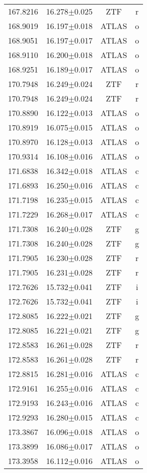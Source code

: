 \begin{table}
\begin{tabular}{cccc}
167.8216 & 16.278$\pm$0.025 & ZTF & r \\
168.9019 & 16.197$\pm$0.018 & ATLAS & o \\
168.9051 & 16.197$\pm$0.017 & ATLAS & o \\
168.9110 & 16.200$\pm$0.018 & ATLAS & o \\
168.9251 & 16.189$\pm$0.017 & ATLAS & o \\
170.7948 & 16.249$\pm$0.024 & ZTF & r \\
170.7948 & 16.249$\pm$0.024 & ZTF & r \\
170.8890 & 16.122$\pm$0.013 & ATLAS & o \\
170.8919 & 16.075$\pm$0.015 & ATLAS & o \\
170.8970 & 16.128$\pm$0.013 & ATLAS & o \\
170.9314 & 16.108$\pm$0.016 & ATLAS & o \\
171.6838 & 16.342$\pm$0.018 & ATLAS & c \\
171.6893 & 16.250$\pm$0.016 & ATLAS & c \\
171.7198 & 16.235$\pm$0.015 & ATLAS & c \\
171.7229 & 16.268$\pm$0.017 & ATLAS & c \\
171.7308 & 16.240$\pm$0.028 & ZTF & g \\
171.7308 & 16.240$\pm$0.028 & ZTF & g \\
171.7905 & 16.230$\pm$0.028 & ZTF & r \\
171.7905 & 16.231$\pm$0.028 & ZTF & r \\
172.7626 & 15.732$\pm$0.041 & ZTF & i \\
172.7626 & 15.732$\pm$0.041 & ZTF & i \\
172.8085 & 16.222$\pm$0.021 & ZTF & g \\
172.8085 & 16.221$\pm$0.021 & ZTF & g \\
172.8583 & 16.261$\pm$0.028 & ZTF & r \\
172.8583 & 16.261$\pm$0.028 & ZTF & r \\
172.8815 & 16.281$\pm$0.016 & ATLAS & c \\
172.9161 & 16.255$\pm$0.016 & ATLAS & c \\
172.9193 & 16.243$\pm$0.016 & ATLAS & c \\
172.9293 & 16.280$\pm$0.015 & ATLAS & c \\
173.3867 & 16.096$\pm$0.018 & ATLAS & o \\
173.3899 & 16.086$\pm$0.017 & ATLAS & o \\
173.3958 & 16.112$\pm$0.016 & ATLAS & o \\

\end{tabular}
\end{table}
